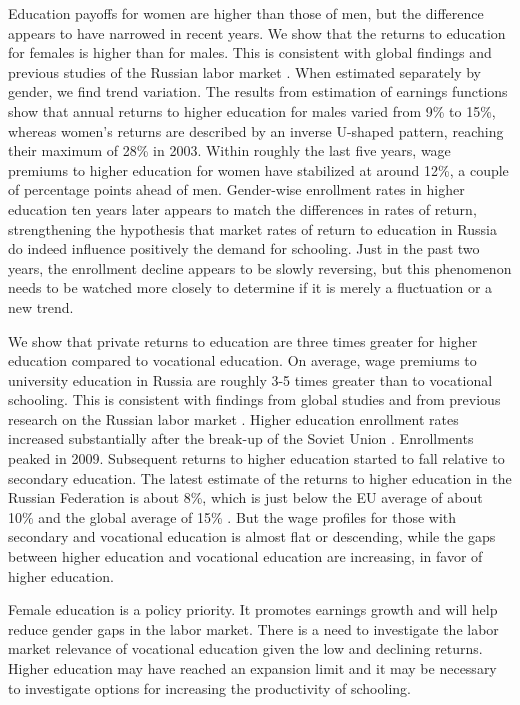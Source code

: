 \documentclass[alpha-refs]{wiley-article-01g}
\begin{document}
Education payoffs for women are higher than those of men, but the 
difference appears to have narrowed in recent years. We show that the 
returns to education for females is higher than for males. This is 
consistent with global findings \parencite{Psacharopoulos_Patrinos2018}  
and previous studies of the Russian labor market 
\parencite{Cheidvasser2007,Lukyanova2010}. When estimated separately by 
gender, we find trend variation. The results from estimation of earnings 
functions show that annual returns to higher education for males varied 
from 9\% to 15\%, whereas women's returns are described by an inverse 
U-shaped pattern, reaching their maximum of 28\% in 2003. Within roughly 
the last five years, wage premiums to higher education for women have 
stabilized at around 12\%, a couple of percentage points ahead of men. 
Gender-wise enrollment rates in higher education ten years later appears to 
match the differences in rates of return, strengthening the hypothesis that 
market rates of return to education in Russia do indeed influence 
positively the demand for schooling. Just in the past two years, the 
enrollment decline appears to be slowly reversing, but this phenomenon 
needs to be watched more closely to determine if it is merely a fluctuation 
or a new trend.

We show that private returns to education are three times greater for 
higher education compared to vocational education. On average, wage 
premiums to university education in Russia are roughly 3-5 times greater 
than to vocational schooling. This is consistent with findings from global 
studies and from previous research on the Russian labor market 
\parencite{Borisov2007, Carnoy2012}. Higher education enrollment rates 
increased substantially after the break-up of the Soviet Union 
\parencite{Belskaya2014}. Enrollments peaked in 2009. Subsequent returns to 
higher education started to fall relative to secondary education. The 
latest estimate of the returns to higher education in the Russian 
Federation is about 8\%, which is just below the EU average of about 10\% 
and the global average of 15\%  \parencite{Psacharopoulos_Patrinos2018}. 
But the wage profiles for those with secondary and vocational education is 
almost flat or descending, while the gaps between higher education and 
vocational education are increasing, in favor of higher education. 

Female education is a policy priority. It promotes earnings growth and will help reduce gender gaps in the labor market.  There is a need to investigate the labor market relevance of vocational education given the low and declining returns. Higher education may have reached an expansion limit and it may be necessary to investigate options for increasing the productivity of schooling.
\end{document}
